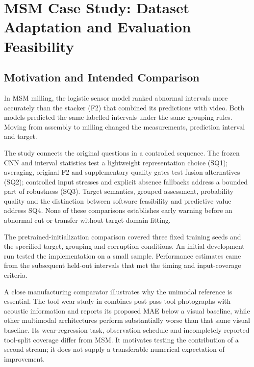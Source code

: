 \chapter{MSM Case Study: Dataset Adaptation and Evaluation Feasibility}
\label{ch:msm}

\section{Motivation and Intended Comparison}
In MSM milling, the logistic sensor model ranked abnormal intervals more accurately than
the stacker (F2) that combined its predictions with video. Both models predicted the
same labelled intervals under the same grouping rules. Moving from assembly to milling
changed the measurements, prediction interval and target.

The study connects the original questions in a controlled sequence. The frozen CNN and
interval statistics test a lightweight representation choice (SQ1); averaging, original
F2 and supplementary quality gates test fusion alternatives (SQ2); controlled input
stresses and explicit absence fallbacks address a bounded part of robustness (SQ3).
Target semantics, grouped assessment, probability quality and the distinction between
software feasibility and predictive value address SQ4. None of these comparisons
establishes early warning before an abnormal cut or transfer without target-domain
fitting.

The pretrained-initialization comparison covered three fixed training seeds and the
specified target, grouping and corruption conditions. An initial development run tested
the implementation on a small sample. Performance estimates came from the subsequent
held-out intervals that met the timing and input-coverage criteria.

A close manufacturing comparator illustrates why the unimodal reference is essential.
The tool-wear study in \citet{P045} combines post-pass tool photographs with acoustic
information and reports its proposed MAE below a visual baseline, while other multimodal
architectures perform substantially worse than that same visual baseline. Its
wear-regression task, observation schedule and incompletely reported tool-split coverage
differ from MSM. It motivates testing the contribution of a second stream; it does not
supply a transferable numerical expectation of improvement.

